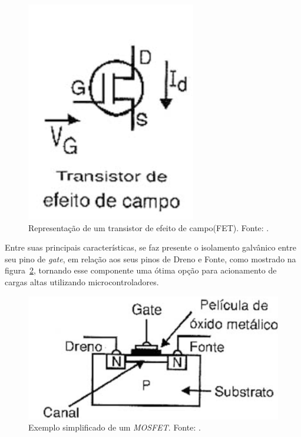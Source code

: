 \FloatBarrier
\begin{figure}[!htbp]
	\centering
	\includegraphics[scale=0.5]{imagens/MOSFET1}
	\caption{Representação de um transistor de efeito de campo(FET). Fonte: .}
	\label{fig:MOSFET1}
\end{figure}
\FloatBarrier

Entre suas principais características, se faz presente o isolamento galvânico entre seu pino de \textit{gate}, em relação aos seus pinos de Dreno e Fonte, como mostrado na figura~\ref{fig:MOSFET2}, tornando esse componente uma ótima opção para acionamento de cargas altas utilizando microcontroladores.

\FloatBarrier
\begin{figure}[!htbp]
	\centering
	\includegraphics[scale=0.5]{imagens/MOSFET2}
	\caption{Exemplo simplificado de um \textit{MOSFET}. Fonte: .}
	\label{fig:MOSFET2}
\end{figure}
\FloatBarrier

